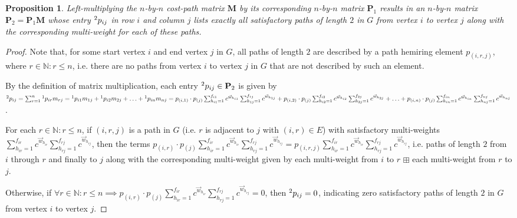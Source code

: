 \documentclass[12pt]{amsart}
\newtheorem{prop}[thm]{Proposition}
\theoremstyle{definition}
\theoremstyle{remark}
\numberwithin{equation}{section}
\newcommand{\N}{\mathbb{N}}
\begin{document}
\begin{prop}
Left-multiplying the $n$-by-$n$ cost-path matrix $\mathbf{M}$ by its corresponding $n$-by-$n$ matrix $\mathbf{P}_1$ results in an $n$-by-$n$ matrix $\mathbf{P}_2 = \mathbf{P}_1 \mathbf{M}$ whose entry $\prescript{2}{}{p_{ij}}$ in row $i$ and column $j$ lists exactly all satisfactory paths of length $2$ in $G$ from vertex $i$ to vertex $j$ along with the corresponding multi-weight for each of these paths.
\end{prop}

\begin{proof}
Note that, for some start vertex $i$ and end vertex $j$ in $G$, all paths of length $2$ are described by a path hemiring element $p_{(i,r,j)}$, where $r \in \N : r \le n$, i.e. there are no paths from vertex $i$ to vertex $j$ in $G$ that are not described by such an element.

By the definition of matrix multiplication, each entry $\prescript{2}{}{p_{ij}} \in \mathbf{P}_2$ is given by $\prescript{2}{}{p_{ij}} = \sum_{r=1}^n \prescript{1}{}{p_{ir}} m_{rj} = \prescript{1}{}{p_{i1}}m_{1j} + \prescript{1}{}{p_{i2}}m_{2j} + \ldots + \prescript{1}{}{p_{in}}m_{nj} = p_{(i,1)} \cdot p_{(j)} \sum_{h_{i1}=1}^{f_{i1}} c^{\vec{w}_{h_{i1}}} \sum_{h_{1j}=1}^{f_{1j}} c^{\vec{w}_{h_{1j}}} + p_{(i,2)} \cdot p_{(j)} \sum_{h_{i2}=1}^{f_{i2}} c^{\vec{w}_{h_{i2}}} \sum_{h_{2j}=1}^{f_{2j}} c^{\vec{w}_{h_{2j}}} + \ldots + p_{(i,n)} \cdot p_{(j)} \sum_{h_{in}=1}^{f_{in}} c^{\vec{w}_{h_{in}}} \sum_{h_{nj}=1}^{f_{nj}} c^{\vec{w}_{h_{nj}}}$.

For each $r \in \N : r \le n$, if $(i, r, j)$ is a path in $G$ (i.e. $r$ is adjacent to $j$ with $(i,r) \in E$) with satisfactory multi-weights $\sum_{h_{ir}=1}^{f_{ir}} c^{\vec{w}_{h_{ir}}} \sum_{h_{rj}=1}^{f_{rj}} c^{\vec{w}_{h_{rj}}}$, then the terms $p_{(i,r)} \cdot p_{(j)} \sum_{h_{ir}=1}^{f_{ir}} c^{\vec{w}_{h_{ir}}} \allowbreak \sum_{h_{rj}=1}^{f_{rj}} c^{\vec{w}_{h_{rj}}} = p_{(i,r,j)} \sum_{h_{ir}=1}^{f_{ir}} c^{\vec{w}_{h_{ir}}} \sum_{h_{rj}=1}^{f_{rj}} c^{\vec{w}_{h_{rj}}}$, i.e. paths of length $2$ from $i$ through $r$ and finally to $j$ along with the corresponding multi-weight given by each multi-weight from $i$ to $r$ $\boxplus$ each multi-weight from $r$ to $j$.

Otherwise, if $\forall r \in \N : r \le n  \implies p_{(i,r)} \cdot p_{(j)} \sum_{h_{ir}=1}^{f_{ir}} c^{\vec{w}_{h_{ir}}} \sum_{h_{rj}=1}^{f_{rj}} c^{\vec{w}_{h_{rj}}} \allowbreak = 0$, then $\prescript{2}{}{p_{ij}} = 0$, indicating zero satisfactory paths of length $2$ in $G$ from vertex $i$ to vertex $j$.


\end{proof}
\end{document}
